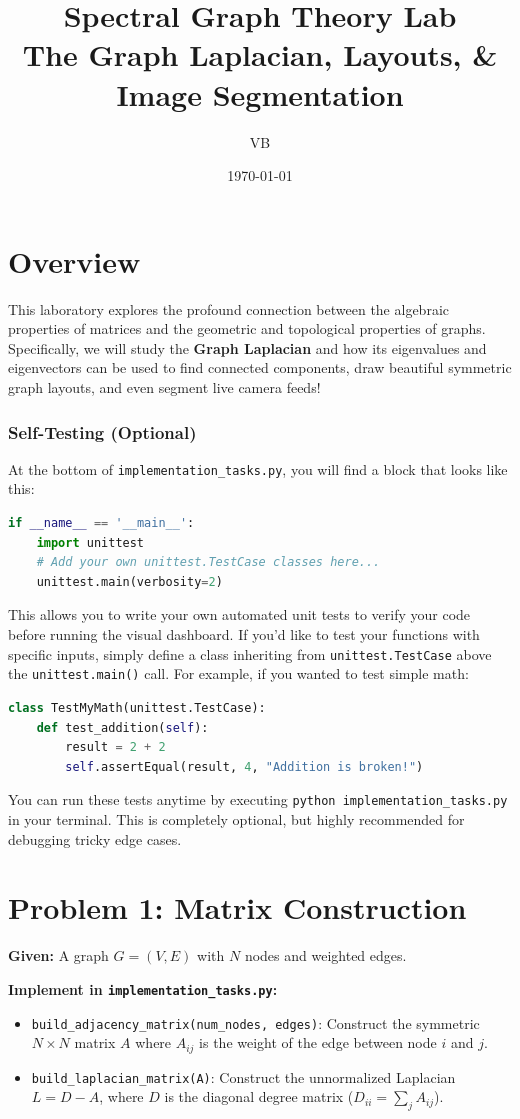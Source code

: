\documentclass[11pt]{article}
\title{Spectral Graph Theory Lab \\ \large The Graph Laplacian, Layouts, \& Image Segmentation}
\author{VB}
\date{\today}
\begin{document}
\maketitle

\section*{Overview}
This laboratory explores the profound connection between the algebraic properties of matrices and the geometric and topological properties of graphs. Specifically, we will study the \textbf{Graph Laplacian} and how its eigenvalues and eigenvectors can be used to find connected components, draw beautiful symmetric graph layouts, and even segment live camera feeds!

\subsubsection*{Self-Testing (Optional)}
At the bottom of \lstinline|implementation_tasks.py|, you will find a block that looks like this:
\begin{lstlisting}[language=Python]
if __name__ == '__main__':
    import unittest
    # Add your own unittest.TestCase classes here...
    unittest.main(verbosity=2)
\end{lstlisting}
This allows you to write your own automated unit tests to verify your code before running the visual dashboard. If you'd like to test your functions with specific inputs, simply define a class inheriting from \lstinline|unittest.TestCase| above the \lstinline|unittest.main()| call. For example, if you wanted to test simple math:
\begin{lstlisting}[language=Python]
class TestMyMath(unittest.TestCase):
    def test_addition(self):
        result = 2 + 2
        self.assertEqual(result, 4, "Addition is broken!")
\end{lstlisting}
You can run these tests anytime by executing \lstinline|python implementation_tasks.py| in your terminal. This is completely optional, but highly recommended for debugging tricky edge cases.

\section*{Problem 1: Matrix Construction}

\textbf{Given:} A graph $G = (V, E)$ with $N$ nodes and weighted edges.

\textbf{Implement in \texttt{implementation\_tasks.py}:}
\begin{itemize}
    \item \lstinline|build_adjacency_matrix(num_nodes, edges)|: Construct the symmetric $N \times N$ matrix $A$ where $A_{ij}$ is the weight of the edge between node $i$ and $j$.
    \item \lstinline|build_laplacian_matrix(A)|: Construct the unnormalized Laplacian $L = D - A$, where $D$ is the diagonal degree matrix ($D_{ii} = \sum_j A_{ij}$).
\end{itemize}
\end{document}
